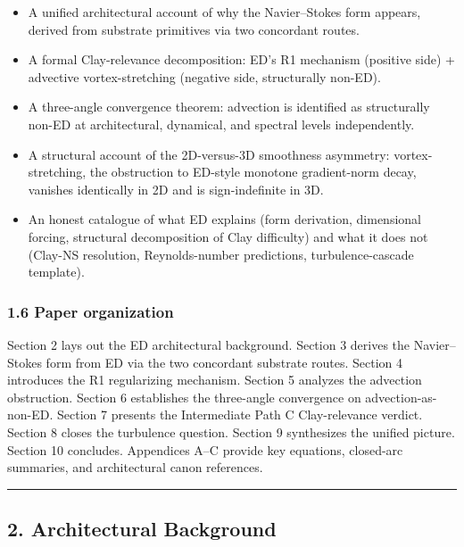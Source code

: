 \documentclass[
  11pt,a4paper]{article}
\providecommand{\tightlist}{%
  \setlength{\itemsep}{0pt}\setlength{\parskip}{0pt}}
\begin{document}
\begin{itemize}
\tightlist
\item
  A unified architectural account of why the Navier--Stokes form
  appears, derived from substrate primitives via two concordant routes.
\item
  A formal Clay-relevance decomposition: ED's R1 mechanism (positive
  side) + advective vortex-stretching (negative side, structurally
  non-ED).
\item
  A three-angle convergence theorem: advection is identified as
  structurally non-ED at architectural, dynamical, and spectral levels
  independently.
\item
  A structural account of the 2D-versus-3D smoothness asymmetry:
  vortex-stretching, the obstruction to ED-style monotone gradient-norm
  decay, vanishes identically in 2D and is sign-indefinite in 3D.
\item
  An honest catalogue of what ED explains (form derivation, dimensional
  forcing, structural decomposition of Clay difficulty) and what it does
  not (Clay-NS resolution, Reynolds-number predictions,
  turbulence-cascade template).
\end{itemize}

\subsubsection{1.6 Paper organization}\label{paper-organization}

Section 2 lays out the ED architectural background. Section 3 derives
the Navier--Stokes form from ED via the two concordant substrate routes.
Section 4 introduces the R1 regularizing mechanism. Section 5 analyzes
the advection obstruction. Section 6 establishes the three-angle
convergence on advection-as-non-ED. Section 7 presents the Intermediate
Path C Clay-relevance verdict. Section 8 closes the turbulence question.
Section 9 synthesizes the unified picture. Section 10 concludes.
Appendices A--C provide key equations, closed-arc summaries, and
architectural canon references.

\begin{center}\rule{0.5\linewidth}{0.5pt}\end{center}

\subsection{2. Architectural Background}\label{architectural-background}
\end{document}
